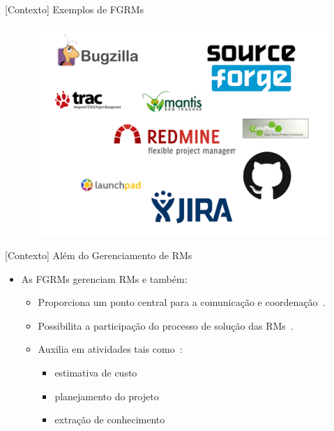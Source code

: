 \documentclass[t,14pt,mathserif]{beamer}
\begin{document}
\begin{frame}{[Contexto] Exemplos de FGRMs}
		\begin{figure}[hbtp]
			\centering
			\includegraphics[scale=.3]{../img/issue-tracking-sytem.png}
		\end{figure}
\end{frame}

\begin{frame}{[Contexto] Além do Gerenciamento de RMs}
    \begin{itemize}
        \item As FGRMs gerenciam RMs e também:

            \begin{itemize}
                \item Proporciona um ponto central para a comunicação e
                      coordenação~\cite{Bertram:2010:CCB:1718918.1718972}.
                \item Possibilita a participação do processo de solução das
                      RMs~\cite{Breu:2010:INB:1718918.1718973}.
                \item Auxilia em atividades tais como~\cite{cavalcanti2013bug}:
                    \begin{itemize}
                        \item estimativa de custo
                        \item planejamento do projeto
                        \item extração de conhecimento
                    \end{itemize}
              \end{itemize}
    \end{itemize}
\end{frame}
\end{document}
